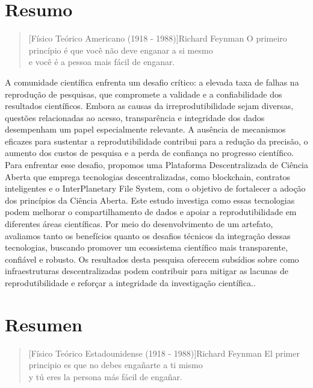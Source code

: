 \documentclass[final]{rc-book-2.14}
\begin{document}
\chapter{Resumo}
\label{chp:general-abstract:portuguese}

\begin{quotation}[Físico Teórico Americano (1918 - 1988)]{Richard Feynman}
    O primeiro princípio é que você não deve enganar a si mesmo \\ e você é a pessoa mais fácil de enganar.
\end{quotation}

\drop A comunidade científica enfrenta um desafio crítico: a elevada taxa de falhas na reprodução de pesquisas, que compromete a validade e a confiabilidade dos resultados científicos. Embora as causas da irreprodutibilidade sejam diversas, questões relacionadas ao acesso, transparência e integridade dos dados desempenham um papel especialmente relevante. A ausência de mecanismos eficazes para sustentar a reprodutibilidade contribui para a redução da precisão, o aumento dos custos de pesquisa e a perda de confiança no progresso científico. Para enfrentar esse desafio, propomos uma Plataforma Descentralizada de Ciência Aberta que emprega tecnologias descentralizadas, como blockchain, contratos inteligentes e o InterPlanetary File System, com o objetivo de fortalecer a adoção dos princípios da Ciência Aberta. Este estudo investiga como essas tecnologias podem melhorar o compartilhamento de dados e apoiar a reprodutibilidade em diferentes áreas científicas. Por meio do desenvolvimento de um artefato, avaliamos tanto os benefícios quanto os desafios técnicos da integração dessas tecnologias, buscando promover um ecossistema científico mais transparente, confiável e robusto. Os resultados desta pesquisa oferecem subsídios sobre como infraestruturas descentralizadas podem contribuir para mitigar as lacunas de reprodutibilidade e reforçar a integridade da investigação científica..


\chapter{Resumen}
\label{chp:general-abstract:spanish}

\begin{quotation}[Físico Teórico Estadounidense (1918 - 1988)]{Richard Feynman}
    El primer principio es que no debes engañarte a ti mismo \\ y tú eres la persona más fácil de engañar.
\end{quotation}
\end{document}
